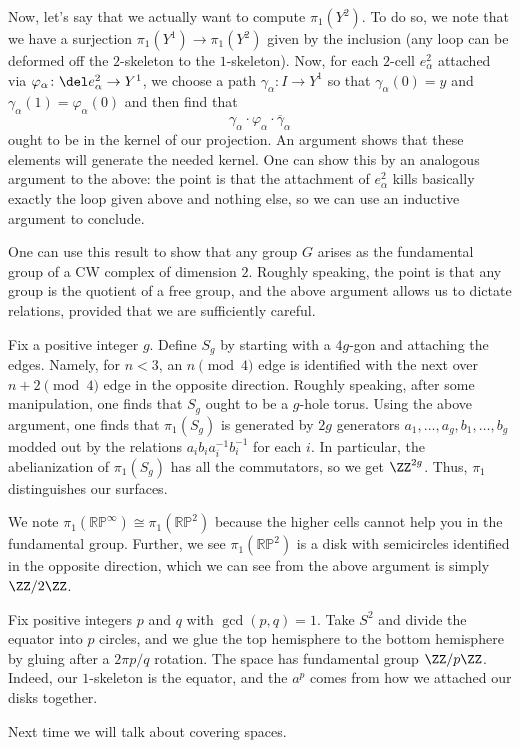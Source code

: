 \documentclass[../notes.tex]{subfiles}
\begin{document}
Now, let's say that we actually want to compute $\pi_1(Y^2)$. To do so, we note that we have a surjection $\pi_1(Y^1)\to\pi_1(Y^2)$ given by the inclusion (any loop can be deformed off the $2$-skeleton to the $1$-skeleton). Now, for each $2$-cell $e_\alpha^2$ attached via $\varphi_\alpha\colon\del e_\alpha^2\to Y^1$, we choose a path $\gamma_\alpha\colon I\to Y^1$ so that $\gamma_\alpha(0)=y$ and $\gamma_\alpha(1)=\varphi_\alpha(0)$ and then find that
\[\gamma_\alpha\cdot\varphi_\alpha\cdot\overline\gamma_\alpha\]
ought to be in the kernel of our projection. An argument shows that these elements will generate the needed kernel. One can show this by an analogous argument to the above: the point is that the attachment of $e_\alpha^2$ kills basically exactly the loop given above and nothing else, so we can use an inductive argument to conclude.
\begin{remark}
	One can use this result to show that any group $G$ arises as the fundamental group of a CW complex of dimension $2$. Roughly speaking, the point is that any group is the quotient of a free group, and the above argument allows us to dictate relations, provided that we are sufficiently careful.
\end{remark}
\begin{example}
	Fix a positive integer $g$. Define $S_g$ by starting with a $4g$-gon and attaching the edges. Namely, for $n<3$, an $n\pmod4$ edge is identified with the next over $n+2\pmod4$ edge in the opposite direction. Roughly speaking, after some manipulation, one finds that $S_g$ ought to be a $g$-hole torus. Using the above argument, one finds that $\pi_1(S_g)$ is generated by $2g$ generators $a_1,\ldots,a_g,b_1,\ldots,b_g$ modded out by the relations $a_ib_ia_i^{-1}b_i^{-1}$ for each $i$. In particular, the abelianization of $\pi_1(S_g)$ has all the commutators, so we get $\ZZ^{2g}$. Thus, $\pi_1$ distinguishes our surfaces.
\end{example}
\begin{example}
	We note $\pi_1(\mathbb{RP}^\infty)\cong\pi_1(\mathbb{RP}^2)$ because the higher cells cannot help you in the fundamental group. Further, we see $\pi_1(\mathbb{RP}^2)$ is a disk with semicircles identified in the opposite direction, which we can see from the above argument is simply $\ZZ/2\ZZ$.
\end{example}
\begin{example}
	Fix positive integers $p$ and $q$ with $\gcd(p,q)=1$. Take $S^2$ and divide the equator into $p$ circles, and we glue the top hemisphere to the bottom hemisphere by gluing after a $2\pi p/q$ rotation. The space has fundamental group $\ZZ/p\ZZ$. Indeed, our $1$-skeleton is the equator, and the $a^p$ comes from how we attached our disks together.
\end{example}
Next time we will talk about covering spaces.
\end{document}
